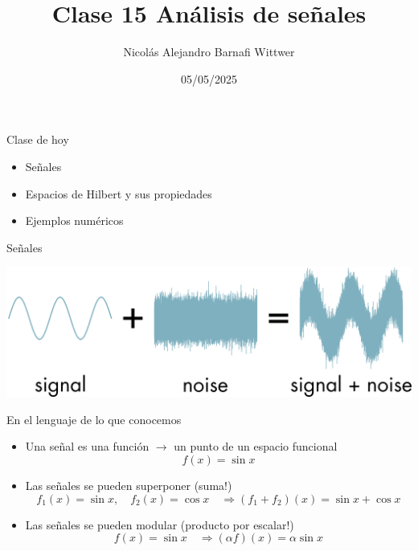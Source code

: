 \documentclass[12pt,aspectratio=169,xcolor=dvipsnames]{beamer}
\title[short title]{Clase 15 Análisis de señales}
\subtitle{}
\author[NA Barnafi] {Nicolás Alejandro Barnafi Wittwer}
\institute[UC|CMM] 
{
    Pontificia Universidad Católica de Chile \\
    Centro de Modelamiento Matemático
}
\date{05/05/2025}
\begin{document}
\begin{frame}
    \maketitle
\end{frame}
\begin{frame}{Clase de hoy}
    \begin{itemize}
        \item Señales
        \item Espacios de Hilbert y sus propiedades
        \item Ejemplos numéricos
    \end{itemize}

    \vspace{1cm}
\end{frame}
\begin{frame}{Señales}
    \begin{center}
        \includegraphics[width=\textwidth]{../images/s2n.png}
    \end{center}
\end{frame}
\begin{frame}{En el lenguaje de lo que conocemos}
    \begin{itemize}
        \item<+-> Una señal es una función $\to$ un punto de un espacio funcional
            $$ f(x) = \sin x $$
        \item<+-> Las señales se pueden superponer (suma!)
            $$ f_1(x)=\sin x, \quad f_2(x) = \cos x \quad \Rightarrow (f_1+f_2)(x) = \sin x + \cos x$$
        \item<+-> Las señales se pueden modular (producto por escalar!)
            $$ f(x) = \sin x \quad \Rightarrow (\alpha f)(x) = \alpha \sin x $$
    \end{itemize}
\end{frame}
\end{document}

